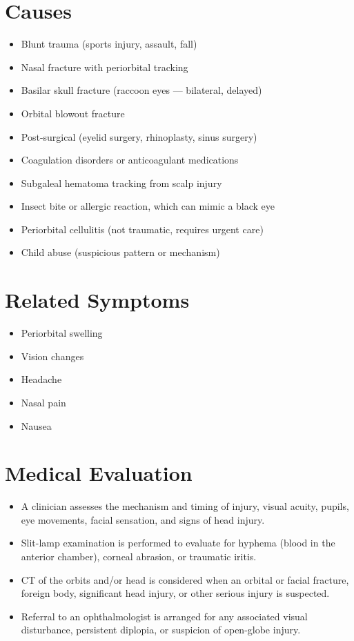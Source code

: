 \section*{Causes}
\begin{itemize}
 \item Blunt trauma (sports injury, assault, fall)
 \item Nasal fracture with periorbital tracking
 \item Basilar skull fracture (raccoon eyes — bilateral, delayed)
 \item Orbital blowout fracture
 \item Post-surgical (eyelid surgery, rhinoplasty, sinus surgery)
 \item Coagulation disorders or anticoagulant medications
 \item Subgaleal hematoma tracking from scalp injury
 \item Insect bite or allergic reaction, which can mimic a black eye
 \item Periorbital cellulitis (not traumatic, requires urgent care)
 \item Child abuse (suspicious pattern or mechanism)
\end{itemize}

\section*{Related Symptoms}
\begin{itemize}
 \item Periorbital swelling
 \item Vision changes
 \item Headache
 \item Nasal pain
 \item Nausea
\end{itemize}

\section*{Medical Evaluation}
\begin{itemize}
 \item A clinician assesses the mechanism and timing of injury, visual acuity, pupils, eye movements, facial sensation, and signs of head injury.
 \item Slit-lamp examination is performed to evaluate for hyphema (blood in the anterior chamber), corneal abrasion, or traumatic iritis.
 \item CT of the orbits and/or head is considered when an orbital or facial fracture, foreign body, significant head injury, or other serious injury is suspected.
 \item Referral to an ophthalmologist is arranged for any associated visual disturbance, persistent diplopia, or suspicion of open-globe injury.
\end{itemize}

